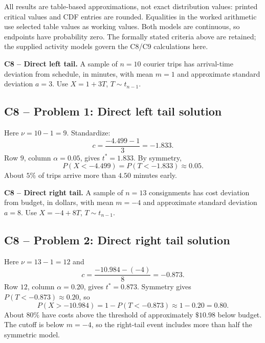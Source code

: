 All results are table-based approximations, not exact distribution values: printed critical values and CDF entries are rounded.
Equalities in the worked arithmetic use selected table values as working values.
Both models are continuous, so endpoints have probability zero.
The formally stated criteria above are retained; the supplied activity models govern the C8/C9 calculations here.


{
\textbf{C8 -- Direct left tail.} A sample of $n=10$ courier trips has arrival-time deviation from schedule, in minutes, with mean $m=1$ and approximate standard deviation $a=3$. Use $X=1+3T$, $T\sim t_{n-1}$.
\label{sol:q1}
\subsection*{C8 -- Problem 1: Direct left tail solution }
Here $\nu=10-1=9$. Standardize:
\[
 c=\frac{-4.499-1}{3}=-1.833.
\]
Row $9$, column $\alpha=0.05$, gives $t^*=1.833$.
By symmetry,
\[
 P(X<-4.499)=P(T<-1.833)\approx\boxed{0.05}.
\]
About $5\%$ of trips arrive more than $4.50$ minutes early.
\secInicio[sec:q1]
}

{
\textbf{C8 -- Direct right tail.} A sample of $n=13$ consignments has cost deviation from budget, in dollars, with mean $m=-4$ and approximate standard deviation $a=8$. Use $X=-4+8T$, $T\sim t_{n-1}$.
\label{sol:q2}
\subsection*{C8 -- Problem 2: Direct right tail solution }
Here $\nu=13-1=12$ and
\[
 c=\frac{-10.984-(-4)}{8}=-0.873.
\]
Row $12$, column $\alpha=0.20$, gives $t^*=0.873$.
Symmetry gives $P(T<-0.873)\approx0.20$, so
\[
 P(X>-10.984)=1-P(T<-0.873)\approx1-0.20=\boxed{0.80}.
\]
About $80\%$ have costs above the threshold of approximately $\$10.98$ below budget.
The cutoff is below $m=-4$, so the right-tail event includes more than half the symmetric model.
\secInicio[sec:q2]
}

